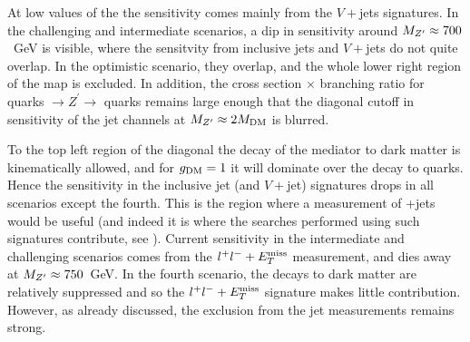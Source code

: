 \documentclass[floatfix]{article}
\begin{document}
At low values of the \MZP the sensitivity comes mainly from the $V+$jets signatures. In the challenging and intermediate scenarios, a dip in sensitivity around 
$M_{Z^{\prime}} \approx 700$~GeV is visible, where the sensitvity from inclusive jets and $V+$jets do not quite overlap. In the optimistic scenario, they overlap, and the whole lower
right region of the map is excluded. In addition, the cross section $\times$ branching ratio for quarks $\rightarrow Z^\prime \rightarrow$ quarks remains large
enough that the diagonal cutoff in sensitivity of the jet channels at $M_{Z^{\prime}} \approx 2M_{\rm DM}$ is blurred. 

To the top left region of the diagonal the decay of the mediator to dark matter is kinematically allowed, and for $g_{\rm DM}=1$ it will dominate 
over the decay to quarks. Hence the sensitivity in the inclusive jet (and $V+$jet) signatures drops in all scenarios except the fourth. 
This is the region where a measurement of \MET+jets would be useful 
(and indeed it is where the searches performed using such signatures contribute, see \cite{Kahlhoefer:2015bea}). Current sensitivity in the intermediate and challenging scenarios 
comes from the $l^+l^- + E_T^{\rm miss}$ measurement, and dies away at $M_{Z^{\prime}} \approx 750$~GeV. In the fourth scenario, the decays to dark matter are relatively suppressed and 
so the $l^+l^- + E_T^{\rm miss}$ signature makes little contribution. However, as already discussed, the exclusion from the jet measurements remains strong.
\end{document}
